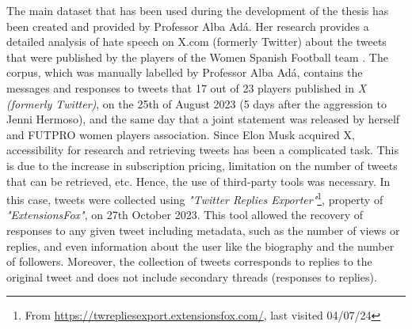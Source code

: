 
The main dataset that has been used during the development of the thesis has been created and provided by Professor Alba Adá. Her research provides a detailed analysis of hate speech on X.com (formerly Twitter) about the tweets that were published by the players of the Women Spanish Football team \cite{lameiras-2024}. The corpus, which was manually labelled by Professor Alba Adá, contains the messages and responses to tweets that 17 out of 23 players published in \textit{X (formerly Twitter)}, on the 25th of August 2023 (5 days after the aggression to Jenni Hermoso), and the same day that a joint statement was released by herself and FUTPRO women players association. Since Elon Musk acquired X, accessibility for research and retrieving tweets has been a complicated task. This is due to the increase in subscription pricing, limitation on the number of tweets that can be retrieved, etc. Hence, the use of third-party tools was necessary. In this case, tweets were collected using \textit{"Twitter Replies Exporter"}\footnote{From \url{https://twrepliesexport.extensionsfox.com/}, last visited 04/07/24}, property of \textit{"ExtensionsFox"}, on 27th October 2023. This tool allowed the recovery of responses to any given tweet including metadata, such as the number of views or replies, and even information about the user like the biography and the number of followers. Moreover, the collection of tweets corresponds to replies to the original tweet and does not include secondary threads (responses to replies).

